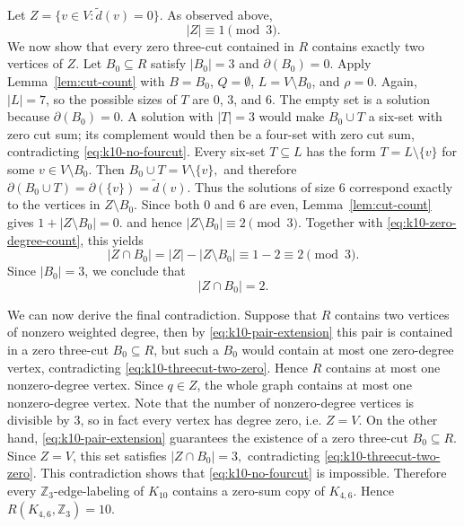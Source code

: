 ﻿\documentclass[11pt]{article}
\numberwithin{equation}{section}
\theoremstyle{remark}
\newcommand{\Z}{\mathbb Z}
\newcommand{\td}{\tilde{d}}
\begin{document}
Let
\(
Z=\{v\in V:\td(v)=0\}.
\)
As observed above,
\begin{equation}\label{eq:k10-zero-degree-count}
    |Z|\equiv1\pmod3.
\end{equation}
We now show that every zero three-cut contained in $R$ contains exactly two vertices of $Z$.  Let $B_0\subseteq R$ satisfy $|B_0|=3$ and $\partial(B_0)=0$.  Apply Lemma~\ref{lem:cut-count} with $B=B_0$, $Q=\emptyset$, $L=V\setminus B_0$, and $\rho=0$.  Again, \(|L|=7\), so the possible sizes of \(T\) are \(0\), \(3\), and \(6\).  The empty set is a solution because \(\partial(B_0)=0\).  A solution with $|T|=3$ would make $B_0\cup T$ a six-set with zero cut sum; its complement would then be a four-set with zero cut sum, contradicting \eqref{eq:k10-no-fourcut}.
Every six-set \(T\subseteq L\) has the form
\(T=L\setminus\{v\}\)
for some \(v\in V\setminus B_0\).
Then
\(B_0\cup T=V\setminus\{v\},\)
and therefore
\(\partial(B_0\cup T)=\partial(\{v\})=\td(v).\)
Thus the solutions of size \(6\) correspond exactly to the vertices in \(Z\setminus B_0\). Since both \(0\) and \(6\) are even, Lemma~\ref{lem:cut-count} gives $1+|Z\setminus B_0|=0$.
and hence $|Z\setminus B_0|\equiv2\pmod3$.  Together with \eqref{eq:k10-zero-degree-count}, this yields
\[
    |Z\cap B_0|=|Z|-|Z\setminus B_0|\equiv1-2\equiv2\pmod3.
\]
Since $|B_0|=3$, we conclude that
\begin{equation}\label{eq:k10-threecut-two-zero}
    |Z\cap B_0|=2.
\end{equation}

We can now derive the final contradiction. Suppose that \(R\) contains two vertices of nonzero weighted degree, then by \eqref{eq:k10-pair-extension} this pair is contained in a zero three-cut $B_0\subseteq R$, but such a $B_0$ would contain at most one zero-degree vertex, contradicting \eqref{eq:k10-threecut-two-zero}.  Hence $R$ contains at most one nonzero-degree vertex.
Since $q\in Z$, the whole graph contains at most one nonzero-degree vertex. Note that the number of nonzero-degree vertices is divisible by $3$, so in fact every vertex has degree zero, i.e. $Z=V$.
On the other hand, \eqref{eq:k10-pair-extension} guarantees the existence of a zero three-cut \(B_0\subseteq R\). Since \(Z=V\), this set satisfies
\(|Z\cap B_0|=3,\)
contradicting \eqref{eq:k10-threecut-two-zero}.
This contradiction shows that \eqref{eq:k10-no-fourcut} is impossible. Therefore every \(\Z_3\)-edge-labeling of \(K_{10}\) contains a zero-sum copy of \(K_{4,6}\). Hence
\(R(K_{4,6},\Z_3)=10.\)
\end{document}
